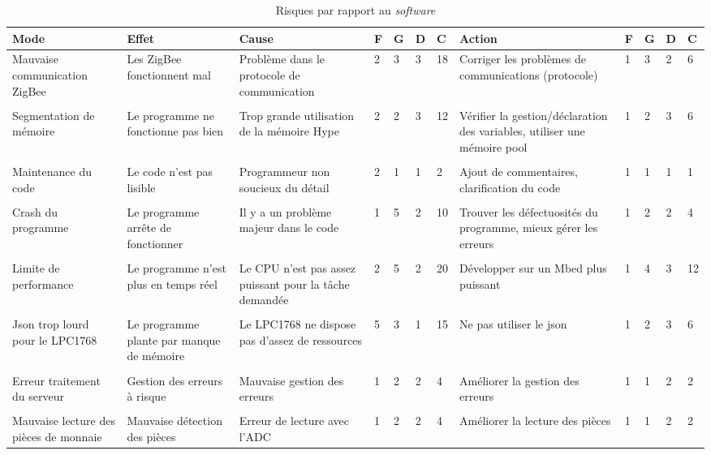 \begin{table}[h]
	\centering
	\caption{Risques par rapport au \emph{software}}
	\begin{tabular}{P{2cm}P{2cm}P{2cm}llllP{2cm}llll}
		\hline
		\bf Mode & \bf Effet & \bf Cause & \bf F & \bf G & \bf D & \bf C & \bf Action & \bf F & \bf G & \bf D & \bf C  \\
		\hline
		\hline
		Mauvaise communication ZigBee & Les ZigBee fonctionnent mal & Problème dans le protocole de communication & 2 & 3 & 3 & 18 & Corriger les problèmes de communications (protocole) & 1 & 3 & 2 & 6 \\\\ 
		Segmentation de mémoire & Le programme ne fonctionne pas bien & Trop grande utilisation de la mémoire Hype & 2 & 2 & 3 & 12 & Vérifier la gestion/déclaration des variables, utiliser une mémoire pool & 1 & 2 & 3 & 6 \\\\
		Maintenance du code & Le code n'est pas lisible & Programmeur non soucieux du détail & 2& 1 & 1 & 2 & Ajout de commentaires, clarification du code & 1 & 1 & 1 & 1 \\\\
		Crash du programme & Le programme arrête de fonctionner & Il y a un problème majeur dans le code & 1 & 5 & 2 & 10 & Trouver les défectuosités du programme, mieux gérer les erreurs & 1 & 2 & 2 & 4 \\\\
		Limite de performance & Le programme n'est plus en temps réel & Le CPU n'est pas assez puissant pour la tâche demandée & 2 & 5 & 2 & 20 & Développer sur un Mbed plus puissant & 1 & 4 & 3 & 12 \\\\
		Json trop lourd pour le LPC1768 & Le programme plante par manque de mémoire & Le LPC1768 ne dispose pas d'assez de ressources & 5 & 3 & 1 & 15 & Ne pas utiliser le json & 1 & 2 & 3 & 6 \\\\
		Erreur traitement du serveur & Gestion des erreurs à risque & Mauvaise gestion des erreurs & 1 & 2 & 2 & 4 & Améliorer la gestion des erreurs & 1 & 1 & 2 & 2 \\\\
		Mauvaise lecture des pièces de monnaie & Mauvaise détection des pièces & Erreur de lecture avec l'ADC & 1 & 2 & 2 & 4 & Améliorer la lecture des pièces & 1 & 1 & 2 & 2 \\
		\hline
	\end{tabular}
\end{table}
